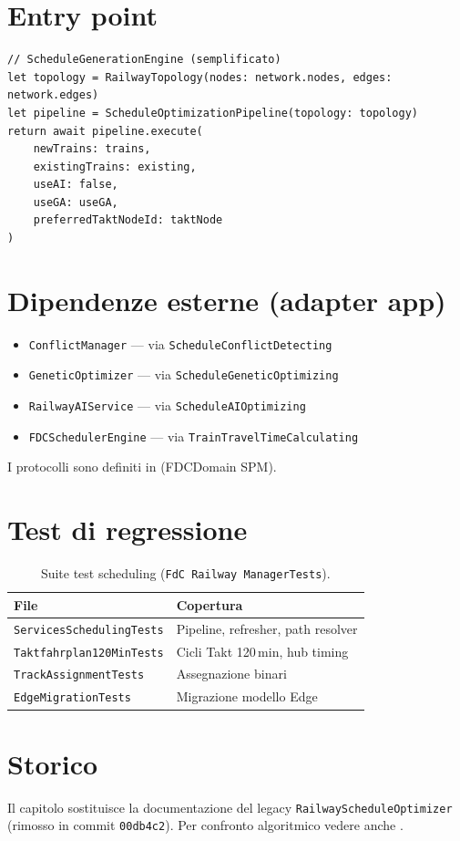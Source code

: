 \section{Entry point}

\begin{lstlisting}
// ScheduleGenerationEngine (semplificato)
let topology = RailwayTopology(nodes: network.nodes, edges: network.edges)
let pipeline = ScheduleOptimizationPipeline(topology: topology)
return await pipeline.execute(
    newTrains: trains,
    existingTrains: existing,
    useAI: false,
    useGA: useGA,
    preferredTaktNodeId: taktNode
)
\end{lstlisting}

\section{Dipendenze esterne (adapter app)}

\begin{itemize}
  \item \texttt{ConflictManager} --- via \texttt{ScheduleConflictDetecting}
  \item \texttt{GeneticOptimizer} --- via \texttt{ScheduleGeneticOptimizing}
  \item \texttt{RailwayAIService} --- via \texttt{ScheduleAIOptimizing}
  \item \texttt{FDCSchedulerEngine} --- via \texttt{TrainTravelTimeCalculating}
\end{itemize}

I protocolli sono definiti in  (FDCDomain SPM).

\section{Test di regressione}

\begin{table}[htbp]
\centering
\caption{Suite test scheduling (\texttt{FdC Railway ManagerTests}).}
\begin{tabular}{ll}
  \toprule
  \textbf{File} & \textbf{Copertura} \\
  \midrule
  \texttt{ServicesSchedulingTests} & Pipeline, refresher, path resolver \\
  \texttt{Taktfahrplan120MinTests} & Cicli Takt 120\,min, hub timing \\
  \texttt{TrackAssignmentTests}   & Assegnazione binari \\
  \texttt{EdgeMigrationTests}     & Migrazione modello Edge \\
  \bottomrule
\end{tabular}
\end{table}

\section{Storico}

Il capitolo sostituisce la documentazione del legacy
\texttt{RailwayScheduleOptimizer} (rimosso in commit \texttt{00db4c2}).
Per confronto algoritmico vedere anche
.
